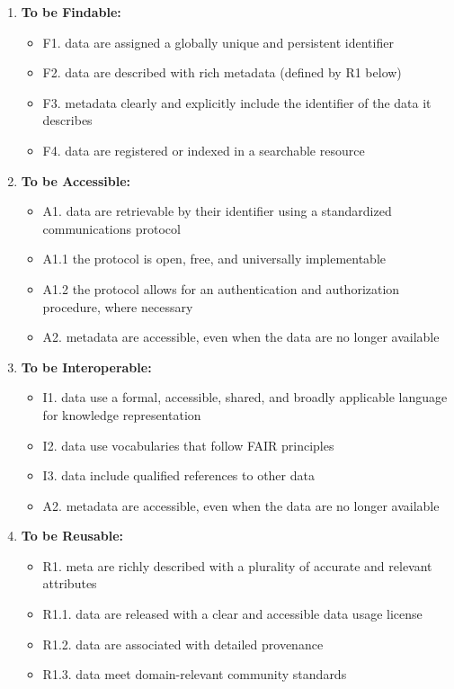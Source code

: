 \documentclass[conference]{IEEEtran}
\begin{document}
\begin{enumerate}
   \item \textbf{To be Findable:} 
   \begin{itemize}
     \item F1. data are assigned a globally unique and persistent identifier
     \item F2. data are described with rich metadata (defined by R1 below)
     \item F3. metadata clearly and explicitly include the identifier of the data it describes
     \item F4. data are registered or indexed in a searchable resource
   \end{itemize}
   
   \item \textbf{To be Accessible:}
   \begin{itemize}
     \item A1. data are retrievable by their identifier using a standardized communications protocol
     \item A1.1 the protocol is open, free, and universally implementable
     \item A1.2 the protocol allows for an authentication and authorization procedure, where necessary
     \item A2. metadata are accessible, even when the data are no longer available
   \end{itemize}
   
   \item \textbf{To be Interoperable:}
   \begin{itemize}
     \item I1. data use a formal, accessible, shared, and broadly applicable language for knowledge representation
     \item I2. data use vocabularies that follow FAIR principles
     \item I3. data include qualified references to other data
     \item A2. metadata are accessible, even when the data are no longer available
   \end{itemize}
   
   \item \textbf{To be Reusable:}
   \begin{itemize}
     \item R1. meta are richly described with a plurality of accurate and relevant attributes
     \item R1.1. data are released with a clear and accessible data usage license
     \item R1.2. data are associated with detailed provenance
     \item R1.3. data meet domain-relevant community standards
   \end{itemize}
   
\end{enumerate}
\end{document}
